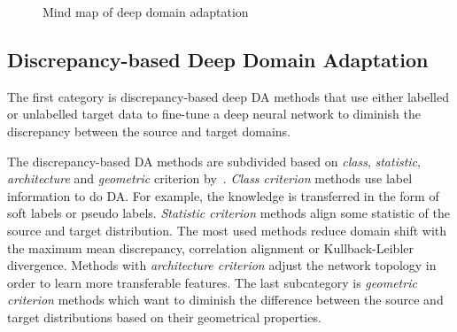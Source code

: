 \begin{figure}
\caption{Mind map of deep domain adaptation}
\label{mind_map}
\end{figure}

\subsection{Discrepancy-based Deep Domain Adaptation}
\label{discrepancy_da}

The first category is discrepancy-based deep DA methods
that use either labelled or unlabelled target data
to fine-tune a deep neural network to diminish the discrepancy
between the source and target domains.

The discrepancy-based DA methods are subdivided based on \textit{class}, \textit{statistic}, \textit{architecture} and \textit{geometric} criterion by~\cite{wang2018}.
\textit{Class criterion} methods use label information to do DA.
For example, the knowledge is transferred in the form of soft labels or pseudo labels.
\textit{Statistic criterion} methods align some statistic of the source and target distribution.
The most used methods reduce domain shift with the maximum mean discrepancy, correlation alignment or Kullback-Leibler divergence.
Methods with \textit{architecture criterion} adjust the network topology in order to learn more transferable features.
The last subcategory is \textit{geometric criterion} methods
which want to diminish the difference between the source and target distributions based on their geometrical properties.

